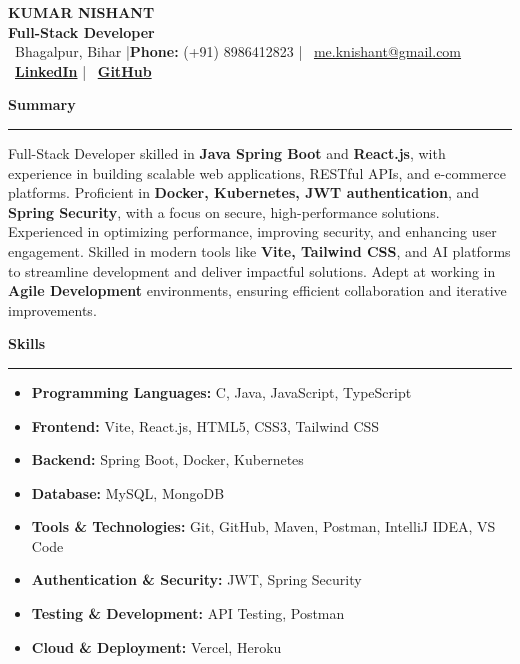 \documentclass[11pt,a4paper]{article}
\newcommand{\sectionheading}[1]{%
    \vspace{0.5em}%
    {\large\headingfont\color{primary}\textbf{#1}}%
    \vspace{0.25em}%
    \hrule%
    \vspace{0.5em}%
}
\newenvironment{cvitemize}{%
    \begin{itemize}[leftmargin=1.5em, nosep, noitemsep]
}{%
    \end{itemize}
}
\begin{document}
\begin{center}
    {\Huge\headingfont\color{primary}\textbf{KUMAR NISHANT}}\\[0.5em]
    {\large\color{secondary}\textbf{Full-Stack Developer}}\\[0.5em]
    {\small \faMapMarker\ Bhagalpur, Bihar \quad |\quad \textbf{Phone:} (+91) 8986412823 \quad | \quad \faEnvelope\ \href{mailto:me.knishant@gmail.com}{me.knishant@gmail.com}}\\[0.25em]
    {\small \faLinkedinSquare\ \href{https://www.linkedin.com/in/kumar-nishant-dev/}{\textbf{LinkedIn}} \quad | \quad \faGithub\ \href{https://github.com/K-Nishant-18}{\textbf{GitHub}}}
\end{center}

\sectionheading{Summary}
\noindent Full-Stack Developer skilled in \textbf{Java Spring Boot} and \textbf{React.js}, with experience in building scalable web applications, RESTful APIs, and e-commerce platforms. Proficient in \textbf{Docker, Kubernetes, JWT authentication}, and \textbf{Spring Security}, with a focus on secure, high-performance solutions. Experienced in optimizing performance, improving security, and enhancing user engagement. Skilled in modern tools like \textbf{Vite, Tailwind CSS}, and AI platforms to streamline development and deliver impactful solutions. Adept at working in \textbf{Agile Development} environments, ensuring efficient collaboration and iterative improvements.



\sectionheading{Skills}
\begin{cvitemize}
    \item \textbf{Programming Languages:} C, Java, JavaScript, TypeScript
    \item \textbf{Frontend:} Vite, React.js, HTML5, CSS3, Tailwind CSS
    \item \textbf{Backend:} Spring Boot, Docker, Kubernetes
    \item \textbf{Database:} MySQL, MongoDB
    \item \textbf{Tools \& Technologies:} Git, GitHub, Maven, Postman, IntelliJ IDEA, VS Code
    \item \textbf{Authentication \& Security:} JWT, Spring Security
    \item \textbf{Testing \& Development:} API Testing, Postman
    \item \textbf{Cloud \& Deployment:} Vercel, Heroku
\end{cvitemize}
\end{document}
